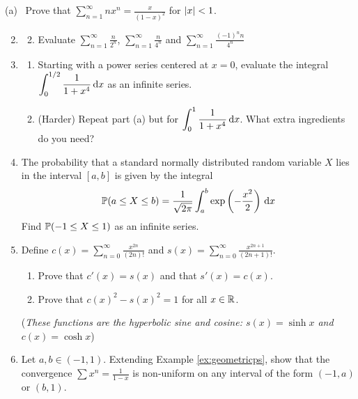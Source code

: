 \clearpage

\begin{exercises}
\exstart (a) \ Prove that $\displaystyle\sum_{n=1}^\infty nx^n=\frac x{(1-x)^2}$ for $\left| x\right|<1$.\vspace{-8pt}

\begin{enumerate}\setcounter{enumi}{1}\itemsep0pt
  \item[]\begin{enumerate}\setcounter{enumii}{1}
   \item Evaluate $\displaystyle\sum_{n=1}^\infty\frac n{2^n}$, $\displaystyle\sum_{n=1}^\infty\frac{n}{4^n}$ and $\displaystyle\sum_{n=1}^\infty\frac{(-1)^nn}{4^n}$
 \end{enumerate}
 
 \item\begin{enumerate}
   \item Starting with a power series centered at $x=0$, evaluate the integral $\displaystyle\int_0^{1/2}\frac 1{1+x^4}\,{\mathrm{d} x}$ as an infinite series.
   \item (Harder) Repeat part (a) but for $\displaystyle\int_0^{1}\frac 1{1+x^4}\,{\mathrm{d} x}$. What extra ingredients do you need? 
 \end{enumerate}
 
 \item The probability that a standard normally distributed random variable $X$ lies in the interval $[a,b]$ is given by the integral
 \[\mathbb{P}(a\le X\le b)=\frac 1{\sqrt{2\pi}}\int_a^b\exp\left(-\frac{x^2}2\right)\,{\mathrm{d} x}\]
 Find $\mathbb{P}(-1\le X\le 1)$ as an infinite series.

 \item Define $\displaystyle c(x)=\sum_{n=0}^\infty\frac{x^{2n}}{(2n)!}$ and $\displaystyle s(x)=\sum_{n=0}^\infty\frac{x^{2n+1}}{(2n+1)!}$.
 \begin{enumerate}
   \item Prove that $c'(x)=s(x)$ and that $s'(x)=c(x)$.
   \item Prove that $c(x)^2-s(x)^2=1$ for all $x\in\mathbb{R}$.
 \end{enumerate}
 (\emph{These functions are the hyperbolic sine and cosine: $s(x)=\sinh x$ and $c(x)=\cosh x$})
 
 
	\item Let $a,b\in(-1,1)$. Extending Example \ref{ex:geometricps}, show that the convergence $\sum x^n=\frac 1{1-x}$ is non-uniform on any interval of the form $(-1,a)$ or $(b,1)$.
	

\end{enumerate}
\end{exercises}
